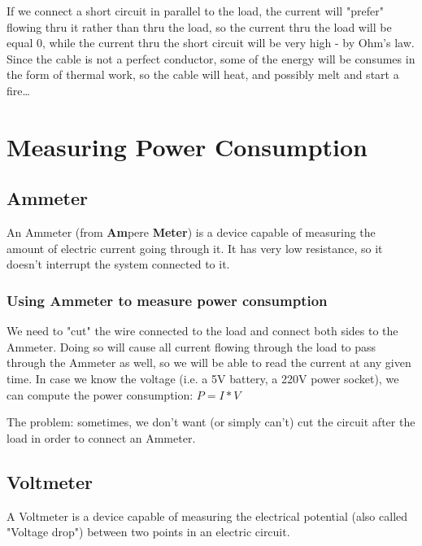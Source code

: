 If we connect a short circuit in parallel to the load, the current will "prefer" flowing thru it rather
than thru the load, so the current thru the load will be equal 0, while the current thru the short
circuit will be very high - by Ohm's law.
Since the cable is not a perfect conductor, some of the energy will be consumes in the form of
thermal work, so the cable will heat, and possibly melt and start a fire\dots

\section{Measuring Power Consumption}
\subsection{Ammeter}
An Ammeter (from \textbf{Am}pere \textbf{Meter}) is a device capable of measuring the amount of
electric current going through it. It has very low resistance, so it doesn't interrupt the system
connected to it.

\subsubsection{Using Ammeter to measure power consumption}
We need to "cut" the wire connected to the load and connect both sides to the Ammeter.
Doing so will cause all current flowing through the load to pass through the Ammeter as well,
so we will be able to read the current at any given time.
In case we know the voltage (i.e. a 5V battery, a 220V power socket), we can compute the power
consumption: $P=I*V$

The problem: sometimes, we don't want (or simply can't) cut the circuit after the load in order
to connect an Ammeter.

\subsection{Voltmeter}
A Voltmeter is a device capable of measuring the electrical potential (also called "Voltage drop")
between two points in an electric circuit.

